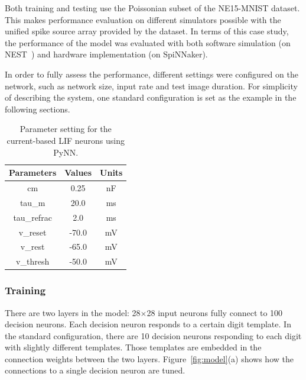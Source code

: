 Both training and testing use the Poissonian subset of the NE15-MNIST dataset.
This makes performance evaluation on different simulators possible with the unified spike source array provided by the dataset. 
In terms of this case study, the performance of the model was evaluated with both software simulation (on NEST~\cite{gewaltig2007nest}) and hardware implementation (on SpiNNaker).

In order to fully assess the performance, different settings were configured on the network, such as network size, input rate and test image duration.
For simplicity of describing the system, one standard configuration is set as the example in the following sections.

\begin{table}[hbbp]
	\centering
	\caption{\label{tbl:pynnSetting}Parameter setting for the current-based LIF neurons using PyNN.}
	\bgroup
	\def\arraystretch{1.4}
	\begin{tabular}{c c c}
		Parameters & Values & Units \\
		\hline
		cm & 0.25 & nF	\\
		tau\_m & 20.0 & ms\\
		tau\_refrac & 2.0 & ms\\
		v\_reset & -70.0 & mV\\
		v\_rest & -65.0 & mV\\
		v\_thresh & -50.0 & mV\\
	\end{tabular}
	\egroup
\end{table}

\subsubsection{Training}
There are two layers in the model: 28$\times$28 input neurons fully connect to 100 decision neurons.
Each decision neuron responds to a certain digit template.
In the standard configuration, there are 10 decision neurons responding to each digit with slightly different templates.
Those templates are embedded in the connection weights between the two layers.
Figure~\ref{fig:model}(a) shows how the connections to a single decision neuron are tuned.

